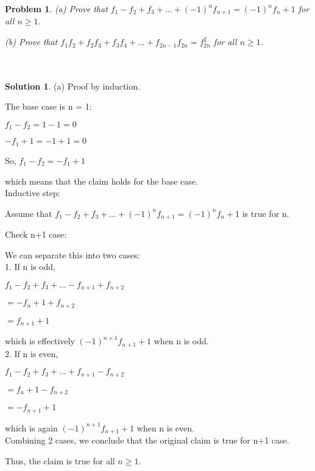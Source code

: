 \documentclass{article}
\newtheorem{problem}{Problem}
\theoremstyle{definition}
\newtheorem*{solution}{Solution}
\begin{document}
\begin{problem}
(a) Prove that \(f_1 - f_2 + f_3 + ... + (-1)^nf_{n+1} = (-1)^nf_n + 1\) for all \(n \ge 1\).

(b) Prove that \(f_1f_2 + f_2f_3 + f_3f_4 + ... + f_{2n-1}f_{2n} = f_{2n}^2\) for all \(n \ge 1\).\\\\\\

\end{problem}

\begin{solution}
(a) Proof by induction.

The base case is n = 1:

\(f_1-f_2 = 1 - 1 = 0\)

\( -f_1 + 1 = -1 + 1 = 0\)

So, \(f_1-f_2 =  -f_1 + 1\)

which means that the claim holds for the base case.\\

Inductive step:

Assume that \(f_1 - f_2 + f_3 + ... + (-1)^nf_{n+1} = (-1)^nf_n + 1\) is true for n.

Check n+1 case:

We can separate this into two cases:\\

1. If n is odd,

\(f_1 - f_2 + f_3 + ...  - f_{n+1} + f_{n+2} \)

\(=  -f_n + 1 + f_{n+2}\)

\(=  f_{n+1} + 1\)

which is effectively \((-1)^{n+1}f_{n+1} + 1\) when n is odd.\\


2. If n is even,

\(f_1 - f_2 + f_3 + ...  + f_{n+1} - f_{n+2} \)

\(=  f_n + 1 - f_{n+2}\)

\(=  -f_{n+1} + 1\)

which is again \((-1)^{n+1}f_{n+1} + 1\) when n is even.\\

Combining 2 cases, we conclude that the original claim is true for n+1 case.

Thus, the claim is true for all \(n \ge 1\).\\\\\\



\end{solution}
\end{document}
